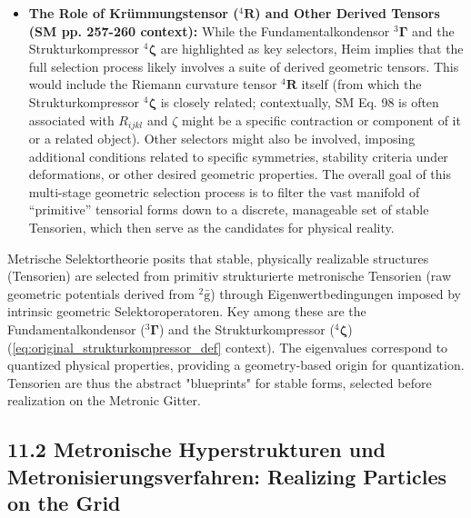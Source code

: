 \documentclass[12pt]{article}
\newcommand{\q}[1]{\enquote{#1}}
\newcommand{\kompositionsfeld}{{}^2\bar{\mathrm{g}}}
\newcommand{\fundamentalkondensor}{{}^3\bm{\Gamma}}
\newcommand{\strukturkompressor}{{}^4\bm{\zeta}}
\begin{document}
\begin{itemize}
    \item \textbf{The Role of Krümmungstensor (\( {}^4\mathbf{R} \)) and Other Derived Tensors (SM pp. 257-260 context):}
    While the Fundamentalkondensor \( \fundamentalkondensor \) and the Strukturkompressor \( \strukturkompressor \) are highlighted as key selectors, Heim implies that the full selection process likely involves a suite of derived geometric tensors. This would include the Riemann curvature tensor \( {}^4\mathbf{R} \) itself (from which the Strukturkompressor \( \strukturkompressor \) is closely related; contextually, SM Eq. 98 is often associated with \(R_{ijkl}\) and \( \zeta \) might be a specific contraction or component of it or a related object). Other selectors might also be involved, imposing additional conditions related to specific symmetries, stability criteria under deformations, or other desired geometric properties. The overall goal of this multi-stage geometric selection process is to filter the vast manifold of \q{primitive} tensorial forms down to a discrete, manageable set of stable Tensorien, which then serve as the candidates for physical reality.
\end{itemize}

Metrische Selektortheorie posits that stable, physically realizable structures (Tensorien) are selected from primitiv strukturierte metronische Tensorien (raw geometric potentials derived from \(\kompositionsfeld\)) through Eigenwertbedingungen imposed by intrinsic geometric Selektoroperatoren. Key among these are the Fundamentalkondensor (\(\fundamentalkondensor\)) and the Strukturkompressor (\(\strukturkompressor\)) (\eqref{eq:original_strukturkompressor_def} context). The eigenvalues correspond to quantized physical properties, providing a geometry-based origin for quantization. Tensorien are thus the abstract "blueprints" for stable forms, selected before realization on the Metronic Gitter.

\subsection{11.2 Metronische Hyperstrukturen und Metronisierungsverfahren: Realizing Particles on the Grid}
\label{sec:hyperstrukturen}
\end{document}
